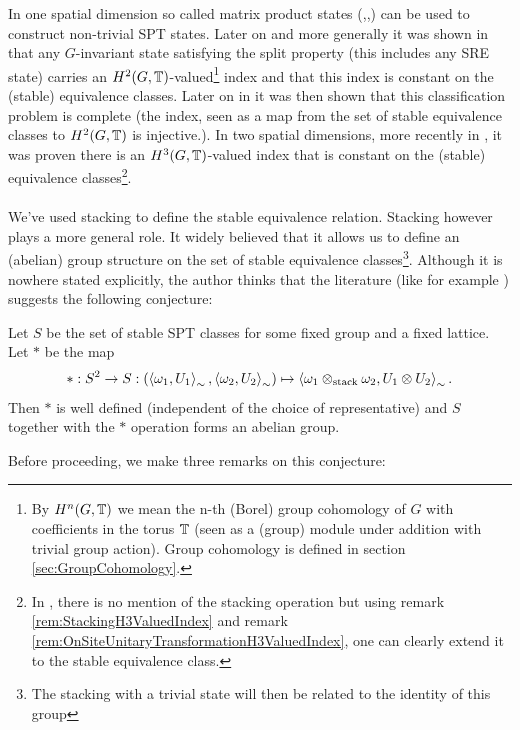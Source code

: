 \documentclass[12pt,a4paper,twoside]{article}
\numberwithin{equation}{section}
\begin{document}
In one spatial dimension so called matrix product states (\cite{Chen_2011},\cite{pollman2012symmetry},\cite{schuch2011MatrixProduct}) can be used to construct non-trivial SPT states. Later on and more generally it was shown in \cite{ogata2019classification} that any $G$-invariant state satisfying the split property (this includes any SRE state) carries an $H^2(G,\mathbb T)$-valued\footnote{By $H^n(G,\mathbb T)$ we mean the n-th (Borel) group cohomology of $G$ with coefficients in the torus $\mathbb T$ (seen as a (group) module under addition with trivial group action). Group cohomology is defined in section \ref{sec:GroupCohomology}.} index and that this index is constant on the (stable) equivalence classes. Later on in \cite{kapustin2021classification} it was then shown that this classification problem is complete (the index, seen as a map from the set of stable equivalence classes to $H^2(G,\mathbb T)$ is injective.). In two spatial dimensions, more recently in \cite{ogata2021h3gmathbb}, it was proven there is an $H^3(G,\mathbb T)$-valued index that is constant on the (stable) equivalence classes\footnote{In \cite{ogata2021h3gmathbb}, there is no mention of the stacking operation but using remark \ref{rem:StackingH3ValuedIndex} and remark \ref{rem:OnSiteUnitaryTransformationH3ValuedIndex}, one can clearly extend it to the stable equivalence class.}.
\\\\
We've used stacking to define the stable equivalence relation. Stacking however plays a more general role. It widely believed that it allows us to define an (abelian) group structure on the set of stable equivalence classes\footnote{The stacking with a trivial state will then be related to the identity of this group}. Although it is nowhere stated explicitly, the author thinks that the literature (like for example \cite{kapustin2021classification}) suggests the following conjecture:
\begin{conjecture}\label{conj:StableEquivGroupStructure}
	Let $S$ be the set of stable SPT classes for some fixed group and a fixed lattice. Let $*$ be the map
	\begin{equation}
		*:S^2\rightarrow S:(\expval{\omega_1,U_1}_{\sim},\expval{\omega_2,U_2}_{\sim})\mapsto \expval{\omega_1\otimes_\text{stack}\omega_2,U_1\otimes U_2}_{\sim}.
	\end{equation}
	Then $*$ is well defined (independent of the choice of representative) and $S$ together with the $*$ operation forms an abelian group.
\end{conjecture}
Before proceeding, we make three remarks on this conjecture:
\end{document}
